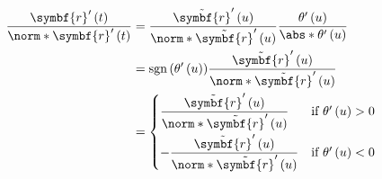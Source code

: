 \documentclass{article}
\DeclareMathOperator{\sign}{sgn}
\begin{document}
\begin{align*}
    \frac{\symbf{r}'\left( t \right)}{\norm*{\symbf{r}'\left( t \right)}} & = \frac{\tilde{\symbf{r}}'\left( u \right)}{\norm*{\tilde{\symbf{r}}'\left( u \right)}} \frac{\theta'\left( u \right)}{\abs*{\theta'\left( u \right)}} \\
                                                                          & = \sign{\left( \theta'\left( u \right) \right)} \frac{\tilde{\symbf{r}}'\left( u \right)}{\norm*{\tilde{\symbf{r}}'\left( u \right)}}                  \\
                                                                          & =
    \begin{cases}
        \displaystyle\frac{\tilde{\symbf{r}}'\left( u \right)}{\norm*{\tilde{\symbf{r}}'\left( u \right)}}  & \text{if } \theta'\left( u \right) > 0 \\[2.5ex]
        -\displaystyle\frac{\tilde{\symbf{r}}'\left( u \right)}{\norm*{\tilde{\symbf{r}}'\left( u \right)}} & \text{if } \theta'\left( u \right) < 0
    \end{cases}
\end{align*}
\end{document}
